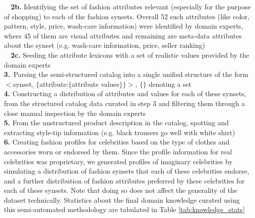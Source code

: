 \documentclass[letterpaper]{article} %
\begin{document}
\-\ \-\ \textbf{2b.} Identifying the set of fashion attributes relevant (especially for the purpose of shopping) to each of the fashion synsets. Overall 52 such attributes (like color, pattern, style, price, wash-care information) were identified by domain experts, where 45 of them are visual attributes and remaining are meta-data attributes about the synset (e.g. wash-care information, price, seller ranking)\\
\-\ \-\ \textbf{2c.} Seeding the attribute lexicons with a set of realistic values provided by the domain experts\\
\textbf{3.}\-\ Parsing the semi-structured catalog into a single unified structure of the form $<$synset, $\{$attribute:$\{$attribute values$\}$$\}$$>$,  $\{\}$ denoting a set\\
\textbf{4.} Constructing a distribution of attributes and values for each of these synsets, from the structured catalog data curated in step 3 and filtering them through a close manual inspection by the domain experts\\
\textbf{5.} From the unstructured product description in the catalog, spotting and extracting style-tip information (e.g. black trousers go well with white shirt)\\
\textbf{6.} Creating fashion profiles for celebrities based on the type of clothes and accessories worn or endorsed by them. 
Since the profile information for real celebrities was proprietary, we generated profiles of imaginary celebrities by simulating a distribution of fashion synsets that each of these celebrities endorse, and a further distribution of fashion attributes preferred by these celebrities for each of these synsets. Note that doing so does not affect the generality of the dataset technically. Statistics about the final domain knowledge curated using this semi-automated methodology are tabulated in Table \ref{tab:knowledge_stats}
\end{document}
